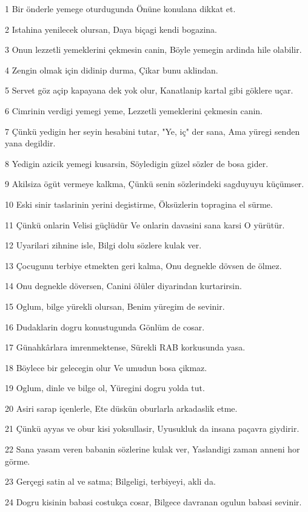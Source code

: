 \par 1 Bir önderle yemege oturdugunda Önüne konulana dikkat et.
\par 2 Istahina yenilecek olursan, Daya biçagi kendi bogazina.
\par 3 Onun lezzetli yemeklerini çekmesin canin, Böyle yemegin ardinda hile olabilir.
\par 4 Zengin olmak için didinip durma, Çikar bunu aklindan.
\par 5 Servet göz açip kapayana dek yok olur, Kanatlanip kartal gibi göklere uçar.
\par 6 Cimrinin verdigi yemegi yeme, Lezzetli yemeklerini çekmesin canin.
\par 7 Çünkü yedigin her seyin hesabini tutar, "Ye, iç" der sana, Ama yüregi senden yana degildir.
\par 8 Yedigin azicik yemegi kusarsin, Söyledigin güzel sözler de bosa gider.
\par 9 Akilsiza ögüt vermeye kalkma, Çünkü senin sözlerindeki sagduyuyu küçümser.
\par 10 Eski sinir taslarinin yerini degistirme, Öksüzlerin topragina el sürme.
\par 11 Çünkü onlarin Velisi güçlüdür Ve onlarin davasini sana karsi O yürütür.
\par 12 Uyarilari zihnine isle, Bilgi dolu sözlere kulak ver.
\par 13 Çocugunu terbiye etmekten geri kalma, Onu degnekle dövsen de ölmez.
\par 14 Onu degnekle döversen, Canini ölüler diyarindan kurtarirsin.
\par 15 Oglum, bilge yürekli olursan, Benim yüregim de sevinir.
\par 16 Dudaklarin dogru konustugunda Gönlüm de cosar.
\par 17 Günahkârlara imrenmektense, Sürekli RAB korkusunda yasa.
\par 18 Böylece bir gelecegin olur Ve umudun bosa çikmaz.
\par 19 Oglum, dinle ve bilge ol, Yüregini dogru yolda tut.
\par 20 Asiri sarap içenlerle, Ete düskün oburlarla arkadaslik etme.
\par 21 Çünkü ayyas ve obur kisi yoksullasir, Uyusukluk da insana paçavra giydirir.
\par 22 Sana yasam veren babanin sözlerine kulak ver, Yaslandigi zaman anneni hor görme.
\par 23 Gerçegi satin al ve satma; Bilgeligi, terbiyeyi, akli da.
\par 24 Dogru kisinin babasi costukça cosar, Bilgece davranan ogulun babasi sevinir.
